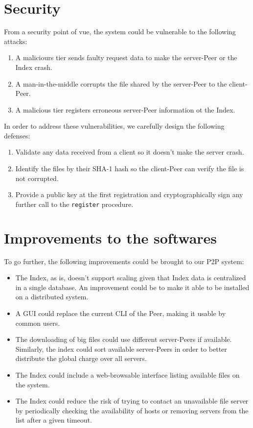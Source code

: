 \documentclass{article}
\begin{document}
\section{Security}

From a security point of vue, the system could be vulnerable to the following attacks:

\begin{enumerate}
	\item A maliciours tier sends faulty request data to make the server-Peer or the Index crash.
	\item A man-in-the-middle corrupts the file shared by the server-Peer to the client-Peer.
	\item A malicious tier registers erroneous server-Peer information ot the Index.
\end{enumerate}

\noindent In order to address these vulnerabilities, we carefully design the following defenses:

\begin{enumerate}
	\item Validate any data received from a client so it doesn't make the server crash.
	\item Identify the files by their SHA-1 hash so the client-Peer can verify the file is not corrupted.
	\item Provide a public key at the first registration and cryptographically sign any further call to the \Verb+register+ procedure.
\end{enumerate}

\section{Improvements to the softwares}

To go further, the following improvements could be brought to our P2P system:

\begin{itemize}
	\item The Index, as is, doesn't support scaling given that Index data is centralized in a single database. An improvement could be to make it able to be installed on a distributed system.
	\item A GUI could replace the current CLI of the Peer, making it usable by common users.
	\item The downloading of big files could use different server-Peers if available. Similarly, the index could sort available server-Peers in order to better distribute the global charge over all servers.
	\item The Index could include a web-browsable interface listing available files on the system.
	\item The Index could reduce the risk of trying to contact an unavailable file server by periodically checking the availability of hosts or removing servers from the list after a given timeout.
\end{itemize}
	
\end{document}
